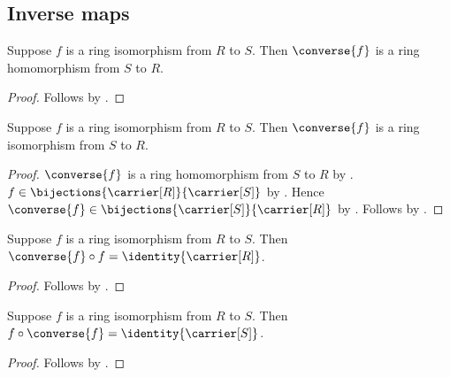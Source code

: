 \subsection{Inverse maps}

\begin{theorem}\label{ring_isomorphism_converse_hom}
    Suppose $f$ is a ring isomorphism from $R$ to $S$.
    Then $\converse{f}$ is a ring homomorphism from $S$ to $R$.
\end{theorem}
\begin{proof}
    Follows by
        .
\end{proof}

\begin{theorem}\label{ring_isomorphism_converse}
    Suppose $f$ is a ring isomorphism from $R$ to $S$.
    Then $\converse{f}$ is a ring isomorphism from $S$ to $R$.
\end{theorem}
\begin{proof}
    $\converse{f}$ is a ring homomorphism from $S$ to $R$ by
        .
    $f\in\bijections{\carrier[R]}{\carrier[S]}$ by
        .
    Hence $\converse{f}\in\bijections{\carrier[S]}{\carrier[R]}$ by
        .
    Follows by .
\end{proof}

\begin{theorem}\label{ring_isomorphism_converse_circ}
    Suppose $f$ is a ring isomorphism from $R$ to $S$.
    Then $\converse{f}\circ f=\identity{\carrier[R]}$.
\end{theorem}
\begin{proof}
    Follows by
        .
\end{proof}

\begin{theorem}\label{ring_isomorphism_circ_converse}
    Suppose $f$ is a ring isomorphism from $R$ to $S$.
    Then $f\circ\converse{f}=\identity{\carrier[S]}$.
\end{theorem}
\begin{proof}
    Follows by
        .
\end{proof}

